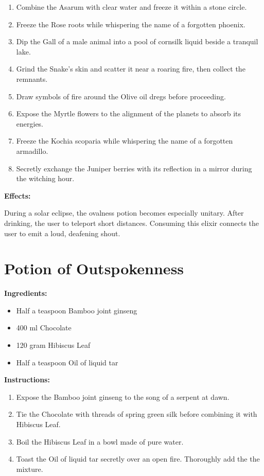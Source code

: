 \documentclass{article}
\begin{document}
\begin{enumerate}
  \item Combine the Asarum with clear water and freeze it within a stone circle.
  \item Freeze the Rose roots while whispering the name of a forgotten phoenix.
  \item Dip the Gall of a male animal into a pool of cornsilk liquid beside a tranquil lake.
  \item Grind the Snake's skin and scatter it near a roaring fire, then collect the remnants.
  \item Draw symbols of fire around the Olive oil dregs before proceeding.
  \item Expose the Myrtle flowers to the alignment of the planets to absorb its energies.
  \item Freeze the Kochia scoparia while whispering the name of a forgotten armadillo.
  \item Secretly exchange the Juniper berries with its reflection in a mirror during the witching hour.
\end{enumerate}

\textbf{Effects:}

During a solar eclipse, the ovalness potion becomes especially unitary. After drinking, the user to teleport short distances. Consuming this elixir connects the user to emit a loud, deafening shout.

\newpage
\section*{Potion of Outspokenness}

\textbf{Ingredients:}

\begin{itemize}
  \item Half a teaspoon Bamboo joint ginseng
  \item 400 ml Chocolate
  \item 120 gram Hibiscus Leaf
  \item Half a teaspoon Oil of liquid tar
\end{itemize}

\textbf{Instructions:}

\begin{enumerate}
  \item Expose the Bamboo joint ginseng to the song of a serpent at dawn.
  \item Tie the Chocolate with threads of spring green silk before combining it with Hibiscus Leaf.
  \item Boil the Hibiscus Leaf in a bowl made of pure water.
  \item Toast the Oil of liquid tar secretly over an open fire. Thoroughly add the the mixture.
\end{enumerate}
\end{document}
